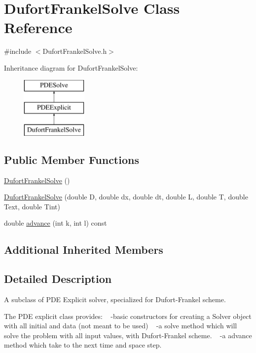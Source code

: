 \hypertarget{class_dufort_frankel_solve}{}\section{Dufort\+Frankel\+Solve Class Reference}
\label{class_dufort_frankel_solve}


{\ttfamily \#include $<$Dufort\+Frankel\+Solve.\+h$>$}

Inheritance diagram for Dufort\+Frankel\+Solve\+:\begin{figure}[H]
\begin{center}
\leavevmode
\includegraphics[height=3.000000cm]{class_dufort_frankel_solve}
\end{center}
\end{figure}
\subsection*{Public Member Functions}
\begin{DoxyCompactItemize}
\item 
\hyperlink{class_dufort_frankel_solve_ae348a9dda0114799f73f65ad852c19f9}{Dufort\+Frankel\+Solve} ()
\item 
\hyperlink{class_dufort_frankel_solve_a2081c0668116f15316e61f95c86bd644}{Dufort\+Frankel\+Solve} (double D, double dx, double dt, double L, double T, double Text, double Tint)
\item 
double \hyperlink{class_dufort_frankel_solve_ab89cf099385aa161de262fbe4db284d8}{advance} (int k, int l) const
\end{DoxyCompactItemize}
\subsection*{Additional Inherited Members}


\subsection{Detailed Description}
A subclass of P\+DE Explicit solver, specialized for Dufort-\/\+Frankel scheme.

The P\+DE explicit class provides\+: ~\newline
-\/basic constructors for creating a Solver object with all initial  and data (not meant to be used) ~\newline
-\/a solve method which will solve the problem with all input values,  with Dufort-\/\+Frankel scheme. ~\newline
-\/a advance method which take to the next time and space step. 

